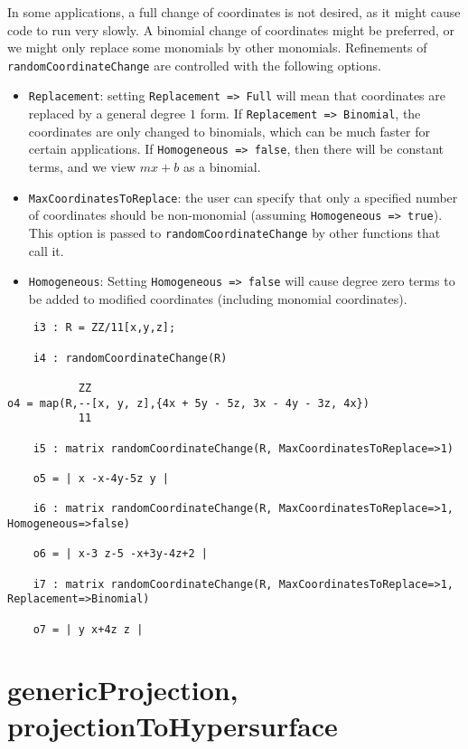 \documentclass[11pt]{amsart}
\theoremstyle{definition}
\begin{document}
	In some applications, a full change of coordinates is not desired, as it might cause code to run very slowly.  A binomial change of coordinates might be preferred, or we might only replace some monomials by other monomials.  
	Refinements of {\tt randomCoordinateChange} are controlled with the following options.
	
	\begin{itemize}
		\item {\tt Replacement}: setting {\tt Replacement => Full} will mean that coordinates are replaced by a general degree $1$ form.  If {\tt Replacement => Binomial}, the coordinates are only changed to binomials, which can be much faster for certain applications. If {\tt Homogeneous => false}, then there will be constant terms, and we view $mx + b$ as a binomial.
		\item {\tt MaxCoordinatesToReplace}: the user can specify that only a specified number of coordinates should be non-monomial (assuming {\tt Homogeneous => true}).  
		This option is passed to {\tt randomCoordinateChange} by other functions that call it. 		
		\item {\tt Homogeneous}:  Setting {\tt Homogeneous => false} will cause degree zero terms to be added to modified coordinates (including monomial coordinates).		
	\end{itemize} 

	{{\small\color{blue}
	\begin{verbatim}
	i3 : R = ZZ/11[x,y,z];

	i4 : randomCoordinateChange(R)

           ZZ
o4 = map(R,--[x, y, z],{4x + 5y - 5z, 3x - 4y - 3z, 4x})                     
           11

	i5 : matrix randomCoordinateChange(R, MaxCoordinatesToReplace=>1)

	o5 = | x -x-4y-5z y |

	i6 : matrix randomCoordinateChange(R, MaxCoordinatesToReplace=>1, Homogeneous=>false)

	o6 = | x-3 z-5 -x+3y-4z+2 |

	i7 : matrix randomCoordinateChange(R, MaxCoordinatesToReplace=>1, Replacement=>Binomial)

	o7 = | y x+4z z |
	\end{verbatim}}
	}
	  

\section{genericProjection, projectionToHypersurface}\label{projectionfunctions}
\end{document}
